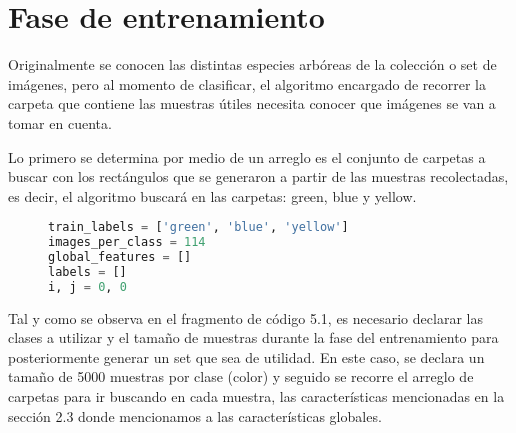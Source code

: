 \section{Fase de entrenamiento}
Originalmente se conocen las distintas especies arbóreas de la colección o set de imágenes, pero al momento de clasificar, el algoritmo encargado de recorrer la carpeta que contiene las muestras útiles  necesita conocer que imágenes se van a tomar en cuenta. 

Lo primero se determina por medio de un arreglo es el conjunto de carpetas a buscar con los rectángulos que se generaron a partir de las muestras recolectadas, es decir, el algoritmo buscará en las carpetas: green, blue y yellow. 

\begin{figure}[H]
\centering
\begin{lstlisting}[basicstyle=\small, language=Python, caption=Código para entrenar modelo]
train_labels = ['green', 'blue', 'yellow']
images_per_class = 114 
global_features = []
labels = []
i, j = 0, 0
\end{lstlisting}
\label{Declaracion-variables}
\end{figure}


Tal y como se observa en el fragmento de código 5.1, es necesario declarar las clases a utilizar y el tamaño de muestras durante la fase del entrenamiento para posteriormente generar un set que sea de utilidad. En este caso, se declara un tamaño de 5000 muestras por clase (color) y seguido se recorre el arreglo de carpetas para ir buscando en cada muestra, las características mencionadas en la sección 2.3 donde mencionamos a las características globales.


